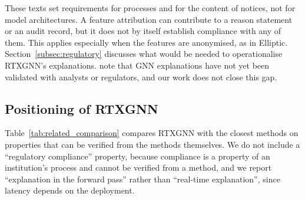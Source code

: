 These texts set requirements for processes and for the content of notices, not for model architectures. A feature attribution can contribute to a reason statement or an audit record, but it does not by itself establish compliance with any of them. This applies especially when the features are anonymised, as in Elliptic. Section~\ref{subsec:regulatory} discusses what would be needed to operationalise RTXGNN's explanations. \citet{cherif2024survey} note that GNN explanations have not yet been validated with analysts or regulators, and our work does not close this gap.

\subsection{Positioning of RTXGNN}

Table~\ref{tab:related_comparison} compares RTXGNN with the closest methods on properties that can be verified from the methods themselves. We do not include a ``regulatory compliance'' property, because compliance is a property of an institution's process and cannot be verified from a method, and we report ``explanation in the forward pass'' rather than ``real-time explanation'', since latency depends on the deployment.

